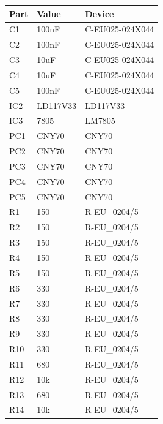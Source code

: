 \documentclass[10pt, a4paper]{article}
\begin{document}
\begin{table}[H]
	\centering
	\begin{tabular}{l|ll}
		\hline
		Part    & Value       & Device          \\ \hline
		C1      & 100nF       & C-EU025-024X044 \\ \hline
		C2      & 100nF       & C-EU025-024X044 \\ \hline
		C3      & 10uF        & C-EU025-024X044 \\ \hline
		C4      & 10uF        & C-EU025-024X044 \\ \hline
		C5      & 100nF       & C-EU025-024X044 \\ \hline
		IC2     & LD117V33     & LD117V33         \\ \hline
		IC3     & 7805         & LM7805           \\ \hline
		PC1     & CNY70       & CNY70           \\ \hline
		PC2     & CNY70       & CNY70           \\ \hline
		PC3     & CNY70       & CNY70           \\ \hline
		PC4     & CNY70       & CNY70           \\ \hline
		PC5     & CNY70       & CNY70           \\ \hline
		R1      & 150         & R-EU\_0204/5    \\ \hline
		R2      & 150         & R-EU\_0204/5    \\ \hline
		R3      & 150         & R-EU\_0204/5    \\ \hline
		R4      & 150         & R-EU\_0204/5    \\ \hline
		R5      & 150         & R-EU\_0204/5    \\ \hline
		R6      & 330         & R-EU\_0204/5    \\ \hline
		R7      & 330         & R-EU\_0204/5    \\ \hline
		R8      & 330         & R-EU\_0204/5    \\ \hline
		R9      & 330         & R-EU\_0204/5    \\ \hline
		R10     & 330         & R-EU\_0204/5    \\ \hline
		R11     & 680         & R-EU\_0204/5    \\ \hline
		R12     & 10k         & R-EU\_0204/5    \\ \hline
		R13     & 680         & R-EU\_0204/5    \\ \hline
		R14     & 10k         & R-EU\_0204/5    \\ \hline

\end{tabular}
\end{table}
\end{document}
